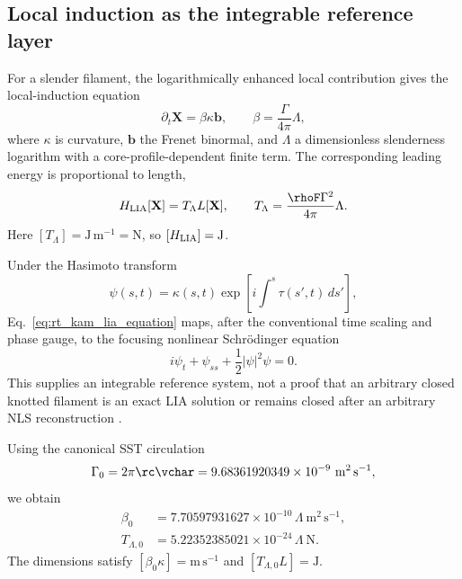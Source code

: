 \subsection{Local induction as the integrable reference layer}
\label{subsec:rt_kam_lia_reference}

For a slender filament, the logarithmically enhanced local contribution gives
the local-induction equation
\begin{equation}
    \partial_t\mathbf X
    =
    \beta\kappa\mathbf b,
    \qquad
    \beta
    =
    \frac{\Gamma}{4\pi}\Lambda,
    \label{eq:rt_kam_lia_equation}
\end{equation}
where \(\kappa\) is curvature, \(\mathbf b\) the Frenet binormal, and
\(\Lambda\) a dimensionless slenderness logarithm with a core-profile-dependent
finite term.  The corresponding leading energy is proportional to length,
\begin{equation}
    H_{\rm LIA}[\mathbf X]
    =
    T_{\Lambda}L[\mathbf X],
    \qquad
    T_{\Lambda}
    =
    \frac{\rhoF\Gamma^2}{4\pi}\Lambda.
    \label{eq:rt_kam_lia_hamiltonian}
\end{equation}
Here \([T_{\Lambda}]=\mathrm{J\,m^{-1}}=\mathrm N\), so
\([H_{\rm LIA}]=\mathrm J\).

Under the Hasimoto transform
\begin{equation}
    \psi(s,t)
    =
    \kappa(s,t)
    \exp\!\left[
    i\int^s\tau(s',t)\,ds'
    \right],
    \label{eq:rt_kam_hasimoto_transform}
\end{equation}
Eq.~\eqref{eq:rt_kam_lia_equation} maps, after the conventional time scaling
and phase gauge, to the focusing nonlinear Schr\"odinger equation
\begin{equation}
    i\psi_t+\psi_{ss}+\frac12|\psi|^2\psi=0.
    \label{eq:rt_kam_focusing_nlse}
\end{equation}
This supplies an integrable reference system, not a proof that an arbitrary
closed knotted filament is an exact LIA solution or remains closed after an
arbitrary NLS reconstruction \cite{Hasimoto1972,JerrardSeis2017}.

Using the canonical SST circulation
\begin{equation}
    \Gamma_0
    =
    2\pi\rc\vchar
    =
    9.68361920349\times10^{-9}\ \mathrm{m^2\,s^{-1}},
    \label{eq:rt_kam_gamma_numeric}
\end{equation}
we obtain
\begin{align}
    \beta_0
    &=
    7.70597931627\times10^{-10}\,\Lambda
    \ \mathrm{m^2\,s^{-1}},
    \label{eq:rt_kam_beta_numeric}
    \\
    T_{\Lambda,0}
    &=
    5.22352385021\times10^{-24}\,\Lambda
    \ \mathrm{N}.
    \label{eq:rt_kam_line_tension_numeric}
\end{align}
The dimensions satisfy
\([\beta_0\kappa]=\mathrm{m\,s^{-1}}\) and
\([T_{\Lambda,0}L]=\mathrm J\).

